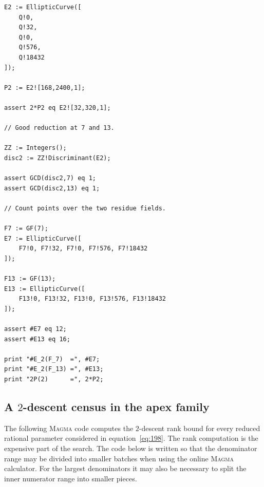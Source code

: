 \documentclass[11pt]{amsart}
\theoremstyle{plain}
\theoremstyle{remark}
\theoremstyle{plain}
\begin{document}
\begin{verbatim}
E2 := EllipticCurve([
    Q!0,
    Q!32,
    Q!0,
    Q!576,
    Q!18432
]);

P2 := E2![168,2400,1];

assert 2*P2 eq E2![32,320,1];

// Good reduction at 7 and 13.

ZZ := Integers();
disc2 := ZZ!Discriminant(E2);

assert GCD(disc2,7) eq 1;
assert GCD(disc2,13) eq 1;

// Count points over the two residue fields.

F7 := GF(7);
E7 := EllipticCurve([
    F7!0, F7!32, F7!0, F7!576, F7!18432
]);

F13 := GF(13);
E13 := EllipticCurve([
    F13!0, F13!32, F13!0, F13!576, F13!18432
]);

assert #E7 eq 12;
assert #E13 eq 16;

print "#E_2(F_7)  =", #E7;
print "#E_2(F_13) =", #E13;
print "2P(2)      =", 2*P2;
\end{verbatim}





\subsection{A $2$-descent census in the apex family}
\label{app:apex-rank-census}


The following \textsc{Magma} code computes the $2$-descent rank bound for every reduced rational
parameter considered in equation~\eqref{eq:198}.
The rank computation is the expensive part of the search. The code
below is written so that the denominator range may be divided into
smaller batches when using the online \textsc{Magma} calculator.
For the largest denominators it may also be necessary to split the
inner numerator range into smaller pieces.
\end{document}
